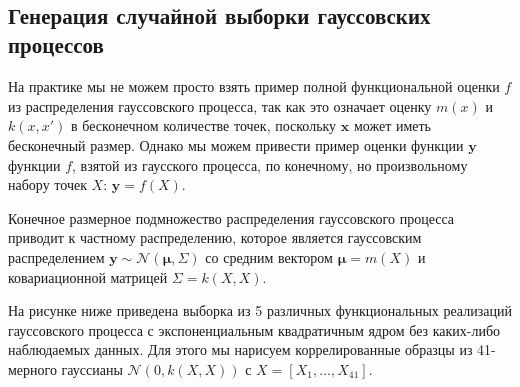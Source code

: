 \documentclass[11pt,a4paper]{article}
\begin{document}
    \begin{center}
    \end{center}
    { \hspace*{\fill} \\}
    
    \hypertarget{ux433ux435ux43dux435ux440ux430ux446ux438ux44f-ux441ux43bux443ux447ux430ux439ux43dux43eux439-ux432ux44bux431ux43eux440ux43aux438-ux433ux430ux443ux441ux441ux43eux432ux441ux43aux438ux445-ux43fux440ux43eux446ux435ux441ux441ux43eux432}{%
\subsection{Генерация случайной выборки гауссовских
процессов}\label{ux433ux435ux43dux435ux440ux430ux446ux438ux44f-ux441ux43bux443ux447ux430ux439ux43dux43eux439-ux432ux44bux431ux43eux440ux43aux438-ux433ux430ux443ux441ux441ux43eux432ux441ux43aux438ux445-ux43fux440ux43eux446ux435ux441ux441ux43eux432}}

На практике мы не можем просто взять пример полной функциональной оценки
\(f\) из распределения гауссовского процесса, так как это означает
оценку \(m(x)\) и \(k(x,x')\) в бесконечном количестве точек, поскольку
\(\mathbf{x}\) может иметь бесконечный размер. Однако мы можем привести
пример оценки функции \(\mathbf{y}\) функции \(f\), взятой из гаусского
процесса, по конечному, но произвольному набору точек \(X\):
\(\mathbf{y} = f(X)\).

Конечное размерное подмножество распределения гауссовского процесса
приводит к частному распределению, которое является гауссовским
распределением \(\mathbf{y} \sim \mathcal{N}(\mathbf{\mu}, \Sigma)\) со
средним вектором \(\mathbf{\mu} = m(X)\) и ковариационной матрицей
\(\Sigma = k(X, X)\).

На рисунке ниже приведена выборка из 5 различных функциональных
реализаций гауссовского процесса с экспоненциальным квадратичным ядром
без каких-либо наблюдаемых данных. Для этого мы нарисуем коррелированные
образцы из 41-мерного гауссианы \(\mathcal{N}(0, k(X, X))\) с
\(X = [X_1, \ldots, X_{41}]\).
\end{document}
